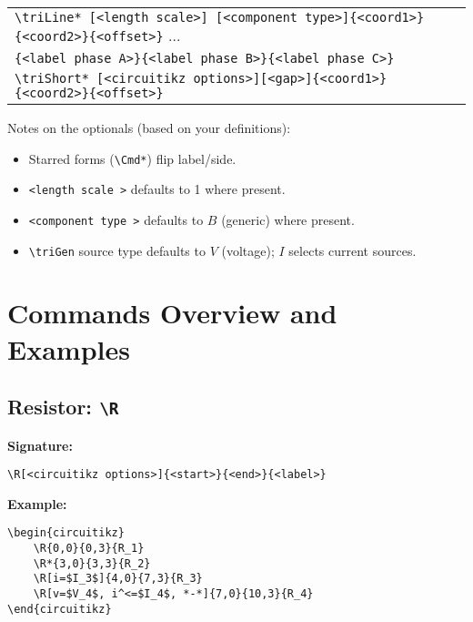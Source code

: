 \documentclass[a4paper,12pt]{article}
\begin{document}
\begin{center}
\begin{tabular}{l}
        \texttt{\textbackslash triLine* [\textless length scale\textgreater] [\textless component type\textgreater]\{\textless coord1\textgreater\}\{\textless coord2\textgreater\}\{\textless offset\textgreater\}} ...\\
        \qquad\qquad\texttt{\{\textless label phase A\textgreater\}\{\textless label phase B\textgreater\}\{\textless label phase C\textgreater\}} \\
        \texttt{\textbackslash triShort* [\textless circuitikz options\textgreater][\textless gap\textgreater]\{\textless coord1\textgreater\}\{\textless coord2\textgreater\}\{\textless offset\textgreater\}}\\
        \hline
        \hline
    \end{tabular}
\end{center}


Notes on the optionals (based on your definitions):

\begin{itemize} 
  \item Starred forms (\texttt{\textbackslash Cmd*}) flip label/side.
  \item \texttt{\textless length scale \textgreater} defaults to 1 where present.
  \item \texttt{\textless component type \textgreater} defaults to $B$ (generic) where present.
  \item \texttt{\textbackslash triGen} source type defaults to $V$ (voltage); $I$ selects current sources.
\end{itemize}

\section{Commands Overview and Examples}
\subsection{Resistor: \texttt{\textbackslash R}}

\textbf{Signature:}
\begin{verbatim}
\R[<circuitikz options>]{<start>}{<end>}{<label>}
\end{verbatim}

\textbf{Example:}

\begin{lstlisting}[style=latexstyle]
\begin{circuitikz}
	\R{0,0}{0,3}{R_1}
	\R*{3,0}{3,3}{R_2}
	\R[i=$I_3$]{4,0}{7,3}{R_3}
	\R[v=$V_4$, i^<=$I_4$, *-*]{7,0}{10,3}{R_4}
\end{circuitikz}
\end{lstlisting}
\end{document}
